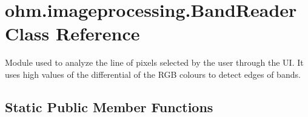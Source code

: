 \hypertarget{classohm_1_1imageprocessing_1_1_band_reader}{}\section{ohm.\+imageprocessing.\+Band\+Reader Class Reference}
\label{classohm_1_1imageprocessing_1_1_band_reader}


Module used to analyze the line of pixels selected by the user through the UI. It uses high values of the differential of the R\+GB colours to detect edges of bands.  


\subsection*{Static Public Member Functions}
